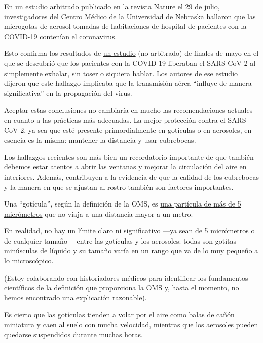 En un \href{https://www.nature.com/articles/s41598-020-69286-3}{estudio
arbitrado} publicado en la revista Nature el 29 de julio, investigadores
del Centro Médico de la Universidad de Nebraska hallaron que las
microgotas de aerosol tomadas de habitaciones de hospital de pacientes
con la COVID-19 contenían el coronavirus.

Esto confirma los resultados de
\href{https://www.medrxiv.org/content/10.1101/2020.05.31.20115154v1}{un
estudio} (no arbitrado) de finales de mayo en el que se descubrió que
los pacientes con la COVID-19 liberaban el SARS-CoV-2 al simplemente
exhalar, sin toser o siquiera hablar. Los autores de ese estudio dijeron
que este hallazgo implicaba que la transmisión aérea ``influye de manera
significativa'' en la propagación del virus.

Aceptar estas conclusiones no cambiaría en mucho las recomendaciones
actuales en cuanto a las prácticas más adecuadas. La mejor protección
contra el SARS-CoV-2, ya sea que esté presente primordialmente en
gotículas o en aerosoles, en esencia es la misma: mantener la distancia
y usar cubrebocas.

Los hallazgos recientes son más bien un recordatorio importante de que
también debemos estar atentos a abrir las ventanas y mejorar la
circulación del aire en interiores. Además, contribuyen a la evidencia
de que la calidad de los cubrebocas y la manera en que se ajustan al
rostro también son factores importantes.

Una ``gotícula'', según la definición de la OMS, es
\href{https://www.who.int/news-room/commentaries/detail/modes-of-transmission-of-virus-causing-covid-19-implications-for-ipc-precaution-recommendations}{una
partícula de más de 5 micrómetros} que no viaja a una distancia mayor a
un metro.

En realidad, no hay un límite claro ni significativo ---ya sean de 5
micrómetros o de cualquier tamaño--- entre las gotículas y los
aerosoles: todas son gotitas minúsculas de líquido y su tamaño varía en
un rango que va de lo muy pequeño a lo microscópico.

(Estoy colaborando con historiadores médicos para identificar los
fundamentos científicos de la definición que proporciona la OMS y, hasta
el momento, no hemos encontrado una explicación razonable).

Es cierto que las gotículas tienden a volar por el aire como balas de
cañón miniatura y caen al suelo con mucha velocidad, mientras que los
aerosoles pueden quedarse suspendidos durante muchas horas.

